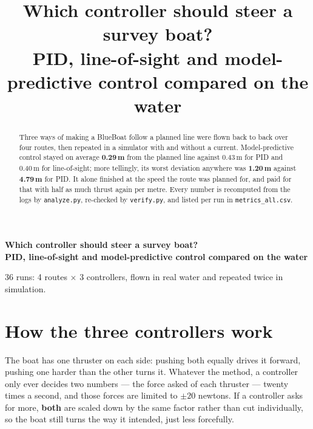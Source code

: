 \documentclass[11pt]{article}
\title{\sffamily\bfseries\color{accent}%
  Which controller should steer a survey boat?\\[2pt]
  \Large PID, line-of-sight and model-predictive control compared on the water}
\begin{document}
\begin{center}
{\sffamily\bfseries\color{accent}\LARGE
Which controller should steer a survey boat?}\\[6pt]
{\sffamily\bfseries\color{accent}\Large
PID, line-of-sight and model-predictive control compared on the water}
\end{center}
\thispagestyle{firststyle}

\vspace{0.9em}
\begin{center}
\small\sffamily\textcolor{rulegray}{%
36 runs: 4 routes $\times$ 3 controllers, flown in real water and repeated twice in simulation.}
\end{center}

\vspace{0.6em}
\renewcommand{\abstractnamefont}{\normalfont\sffamily\bfseries\color{accent}}
\renewcommand{\abstracttextfont}{\normalfont\small}
\begin{abstract}
\noindent
Three ways of making a BlueBoat follow a planned line were flown back to back over four
routes, then repeated in a simulator with and without a current. Model-predictive control
stayed on average \textbf{0.29\,m} from the planned line against 0.43\,m for PID and 0.40\,m
for line-of-sight; more tellingly, its worst deviation anywhere was \textbf{1.20\,m} against
\textbf{4.79\,m} for PID. It alone finished at the speed the route was planned for, and paid
for that with half as much thrust again per metre. Every number is recomputed from the logs
by \texttt{analyze.py}, re-checked by \texttt{verify.py}, and listed per run in
\texttt{metrics\_all.csv}.
\end{abstract}

\section{How the three controllers work}

The boat has one thruster on each side: pushing both equally drives it forward, pushing one
harder than the other turns it. Whatever the method, a controller only ever decides two
numbers --- the force asked of each thruster --- twenty times a second, and those forces are
limited to $\pm20$ newtons. If a controller asks for more, \textbf{both} are scaled down by
the same factor rather than cut individually, so the boat still turns the way it intended,
just less forcefully.
\end{document}
